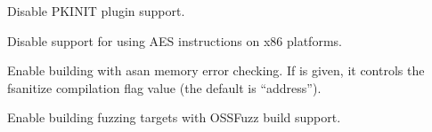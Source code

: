 \documentclass[letterpaper,10pt,english]{sphinxmanual}
\begin{document}
\begin{description}
\sphinxAtStartPar
Disable PKINIT plugin support.

\sphinxAtStartPar
Disable support for using AES instructions on x86 platforms.

\sphinxAtStartPar
Enable building with asan memory error checking.  If  is
given, it controls the \sphinxhyphen{}fsanitize compilation flag value (the
default is “address”).

\sphinxAtStartPar
Enable building fuzzing targets with OSS\sphinxhyphen{}Fuzz build support.

\end{description}
\end{document}
